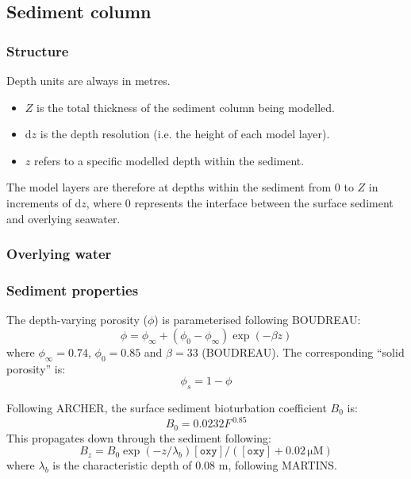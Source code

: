 \documentclass{article}
\newcommand{\D}[1]{\mathrm{d}#1}
\newcommand{\code}[1]{\texttt{#1}}
\newcommand{\conc}[1]{[\code{#1}]}
\newcommand{\uM}{\si{\micro}\mathrm{M}}
\begin{document}
\subsection{Sediment column}

\subsubsection{Structure}

Depth units are always in metres.
\begin{itemize}
  \item $Z$ is the total thickness of the sediment column being modelled.
  \item $\D{z}$ is the depth resolution (i.e. the height of each model layer).
  \item $z$ refers to a specific modelled depth within the sediment.
\end{itemize}
The model layers are therefore at depths within the sediment from $0$ to $Z$ in increments of $\D{z}$, where $0$ represents the interface between the surface sediment and overlying seawater.

\subsubsection{Overlying water}



\subsubsection{Sediment properties}

The depth-varying porosity ($\phi$) is parameterised following BOUDREAU:
\begin{equation}\label{phi}
\phi = \phi_\infty + (\phi_0 - \phi_\infty) \exp(-\beta z)
\end{equation}
where $\phi_\infty = 0.74$, $\phi_0 = 0.85$ and $\beta = 33$ (BOUDREAU). The corresponding ``solid porosity'' is:
\begin{equation}\label{phiS}
\phi_s = 1 - \phi
\end{equation}

Following ARCHER, the surface sediment bioturbation coefficient $B_0$ is:
\begin{equation}
B_0 = 0.0232 F^{\,0.85}
\end{equation}
This propagates down through the sediment following:
\begin{equation}
B_z = B_0 \exp(-z/\lambda_b) \conc{oxy} / (\conc{oxy} + 0.02 \, \uM)
\end{equation}
where $\lambda_b$ is the characteristic depth of 0.08 m, following MARTINS.
\end{document}
